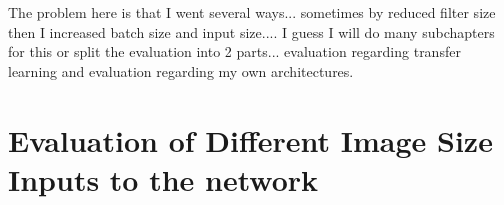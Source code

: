 The problem here is that I went several ways... sometimes by reduced filter size then I increased batch size and input size.... I guess I will do many subchapters for this or split the evaluation into 2 parts... evaluation regarding transfer learning and evaluation regarding my own architectures.










\section{Evaluation of Different Image Size Inputs to the network}

\begin{table}[h] \centering
{}
\caption{Resnet18 FiveCrop Implementation with and without pre-training. FINAL (regular) means ResNet18 with the resizing of the image instead of cropping and averaging}
\label{tbl:resnet18-448}
\end{table}

\begin{table}[h] \centering
{}
\caption{Resnet18 FiveCrop Implementation with and without pre-training. FINAL (regular) means ResNet18 with the resizing of the image instead of cropping and averaging}
\label{tbl:resnet18-896}
\end{table}


